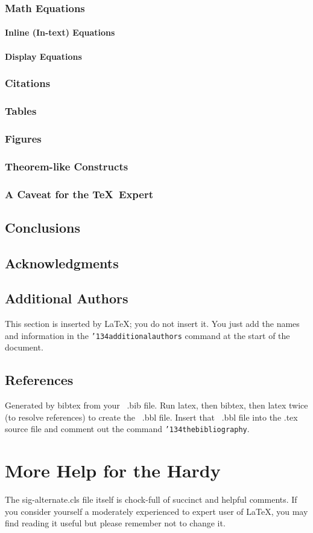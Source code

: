 \documentclass{sig-alternate}
\begin{document}
\subsubsection{Math Equations}
\paragraph{Inline (In-text) Equations}
\paragraph{Display Equations}
\subsubsection{Citations}
\subsubsection{Tables}
\subsubsection{Figures}
\subsubsection{Theorem-like Constructs}
\subsubsection*{A Caveat for the \TeX\ Expert}
\subsection{Conclusions}
\subsection{Acknowledgments}
\subsection{Additional Authors}
This section is inserted by \LaTeX; you do not insert it.
You just add the names and information in the
\texttt{{\char'134}additionalauthors} command at the start
of the document.
\subsection{References}
Generated by bibtex from your ~.bib file.  Run latex,
then bibtex, then latex twice (to resolve references)
to create the ~.bbl file.  Insert that ~.bbl file into
the .tex source file and comment out
the command \texttt{{\char'134}thebibliography}.
\section{More Help for the Hardy}
The sig-alternate.cls file itself is chock-full of succinct
and helpful comments.  If you consider yourself a moderately
experienced to expert user of \LaTeX, you may find reading
it useful but please remember not to change it.
\end{document}
